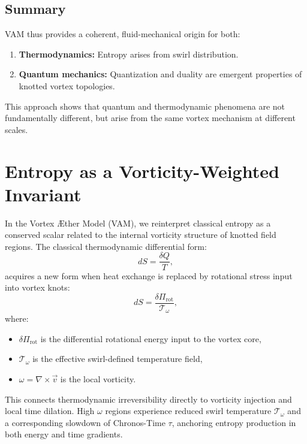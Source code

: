\documentclass[preprint]{revtex4-2}
\begin{document}
\subsection{Summary}

VAM thus provides a coherent, fluid-mechanical origin for both:

\begin{enumerate}
    \item \textbf{Thermodynamics:} Entropy arises from swirl distribution.
    \item \textbf{Quantum mechanics:} Quantization and duality are emergent properties of knotted vortex topologies.
\end{enumerate}

This approach shows that quantum and thermodynamic phenomena are not fundamentally different, but arise from the same vortex mechanism at different scales.

\section*{Entropy as a Vorticity-Weighted Invariant}\label{sec:entropy_vorticity}

In the Vortex Æther Model (VAM), we reinterpret classical entropy as a conserved scalar related to the internal vorticity structure of knotted field regions. The classical thermodynamic differential form:
\begin{equation}
    dS = \frac{\delta Q}{T},
\end{equation}
acquires a new form when heat exchange is replaced by rotational stress input into vortex knots:
\begin{equation}
    dS = \frac{\delta \Pi_\text{rot}}{\mathcal{T}_\omega},
\end{equation}
where:
\begin{itemize}
    \item $\delta \Pi_\text{rot}$ is the differential rotational energy input to the vortex core,
    \item $\mathcal{T}_\omega$ is the effective swirl-defined temperature field,
    \item $\omega = \nabla \times \vec{v}$ is the local vorticity.
\end{itemize}
This connects thermodynamic irreversibility directly to vorticity injection and local time dilation.
High $\omega$ regions experience reduced swirl temperature $\mathcal{T}_\omega$ and a corresponding slowdown of Chronos-Time $\tau$, anchoring entropy production in both energy and time gradients.
\end{document}
